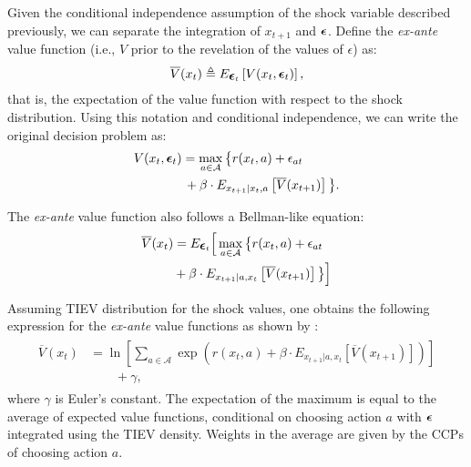 \documentclass{article}
\renewcommand{\vec}[1]{\mbox{\bm{$#1$}}}
\begin{document}
Given the conditional independence assumption of the shock variable described previously, we can separate the integration of $x_{t+1}$ and $\vec{\epsilon}$. Define the \emph{ex-ante} value function (i.e., $V$ prior to the revelation of the values of $\epsilon$) as:
\begin{eqnarray}\label{eq:def_exante}
\overline{V}(x_t)
\triangleq 
E_{\vec{\epsilon}_t} \left[ V(x_t, \vec{\epsilon}_t) \right],
\end{eqnarray}
that is, the expectation of the value function with respect to the shock distribution. Using this notation and conditional independence, we can write the original decision problem as:
%
\begin{align}
\begin{split}
V(x_t,\vec{\epsilon}_t) & =\max_{a\in\mathcal{A}} \big\{ \vphantom{V} r(x_t,a)+\epsilon_{at}  \\
&  \, +\beta \cdot E_{x_{t+1}|x_t,a} \left[ \overline{V}(x_{t+1}) \right] \vphantom{r(x_t, a)} \big\}.
\nonumber
\end{split}
\end{align}


The \emph{ex-ante} value function also follows a Bellman-like equation:
\begin{align} \label{eq:exantebellman}
\begin{split}
\overline{V}(x_t) & = E_{\vec{\epsilon}_t}\Big[\max_{a\in\mathcal{A}} \big\{r(x_t,a)+\epsilon_{at} \\
& +\beta  \cdot E_{x_{t+1}|a,x_t} \left[ \overline{V}(x_{t+1}) \right] \big\}\Big]
\end{split}
\end{align}

Assuming TIEV distribution for the shock values, one obtains the following expression for the \emph{ex-ante} value functions as shown by \cite{rust_gmc}:
\begin{align} \label{eq:exanterust}
\begin{split}
\overline{V}(x_t) &=\ln\left[\sum_{a\in\mathcal{A}} \exp\left(r(x_t,a)+\beta \cdot E_{x_{t+1}|a,x_t} \left[ \overline{V}(x_{t+1}) \right] \right)\right] \\
& \qquad +\gamma,
\end{split}
\end{align}
where $\gamma$ is Euler's constant. The expectation of the maximum is equal to the average of expected value functions, conditional on choosing action $a$ with $\vec{\epsilon}$ integrated using the TIEV density. Weights in the average are given by the CCPs of choosing action $a$.
\end{document}
